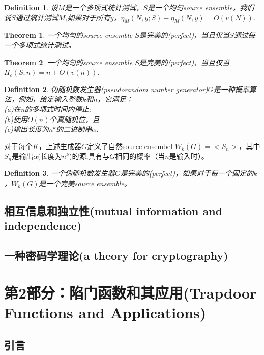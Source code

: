 \documentclass[]{article}
\newtheorem{theorem}{Theorem}
\newtheorem{definition}{Definition}
\begin{document}
\begin{definition}
	设$M$是一个多项式统计测试，$S$是一个均匀source ensemble，我们说$S$通过统计测试$M$,如果对于所有$y$，$\eta_M(N,y;S)-\eta_M(N,y)=O(v(N))$.
\end{definition}

\begin{theorem}
	一个均匀的source ensemble $S$是完美的(perfect)，当且仅当$S$通过每一个多项式统计测试。
\end{theorem}


\begin{theorem}
	一个均匀的source ensemble $S$是完美的(perfect)，当且仅当$H_c(S;n)=n+O(v(n))$.
\end{theorem}


\begin{definition}
	伪随机数发生器(pseudorandom number generator)$G$是一种概率算法，例如，给定输入整数$k$和$n$，它满足：\\
	(a)在n的多项式时间内停止;\\
	(b)使用$O(n)$个真随机位，且\\
	(c)输出长度为$n^k$的二进制串$\alpha$.
\end{definition}

对于每个$K$，上述生成器$G$定义了自然source ensembel $W_k(G)=<S_n>$，其中$S_n$是输出$\alpha$(长度为$n^k$)的源,具有与$G$相同的概率（当$n$是输入时）。

\begin{definition}
	一个伪随机数发生器$G$是完美的(perfect)，如果对于每一个固定的$k$，$W_k(G)$是一个完美source ensemble。
\end{definition}


\subsection{相互信息和独立性(mutual information and independence)}

\subsection{一种密码学理论(a theory for cryptography)}

\section{第2部分：陷门函数和其应用(Trapdoor Functions and Applications)}
\subsection{引言}
\end{document}

